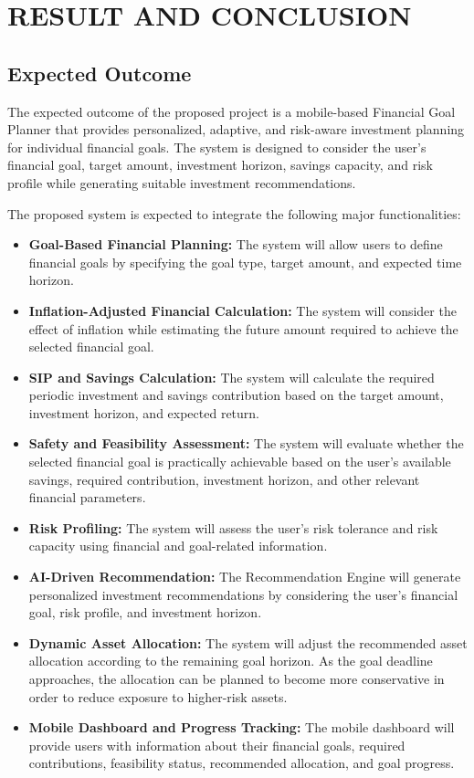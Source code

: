 \chapter{\uppercase{Result and Conclusion}}

\section{Expected Outcome}
The expected outcome of the proposed project is a mobile-based Financial Goal Planner that provides personalized, adaptive, and risk-aware investment planning for individual financial goals. The system is designed to consider the user's financial goal, target amount, investment horizon, savings capacity, and risk profile while generating suitable investment recommendations.

The proposed system is expected to integrate the following major functionalities:
\begin{itemize}
	\item \textbf{Goal-Based Financial Planning:} The system will allow users to define financial goals by specifying the goal type, target amount, and expected time horizon.
	\item \textbf{Inflation-Adjusted Financial Calculation:} The system will consider the effect of inflation while estimating the future amount required to achieve the selected financial goal.
	\item \textbf{SIP and Savings Calculation:} The system will calculate the required periodic investment and savings contribution based on the target amount, investment horizon, and expected return.
	\item \textbf{Safety and Feasibility Assessment:} The system will evaluate whether the selected financial goal is practically achievable based on the user's available savings, required contribution, investment horizon, and other relevant financial parameters.
	\item \textbf{Risk Profiling:} The system will assess the user's risk tolerance and risk capacity using financial and goal-related information.
	\item \textbf{AI-Driven Recommendation:} The Recommendation Engine will generate personalized investment recommendations by considering the user's financial goal, risk profile, and investment horizon.
	\item \textbf{Dynamic Asset Allocation:} The system will adjust the recommended asset allocation according to the remaining goal horizon. As the goal deadline approaches, the allocation can be planned to become more conservative in order to reduce exposure to higher-risk assets.
	\item \textbf{Mobile Dashboard and Progress Tracking:} The mobile dashboard will provide users with information about their financial goals, required contributions, feasibility status, recommended allocation, and goal progress.
\end{itemize}


